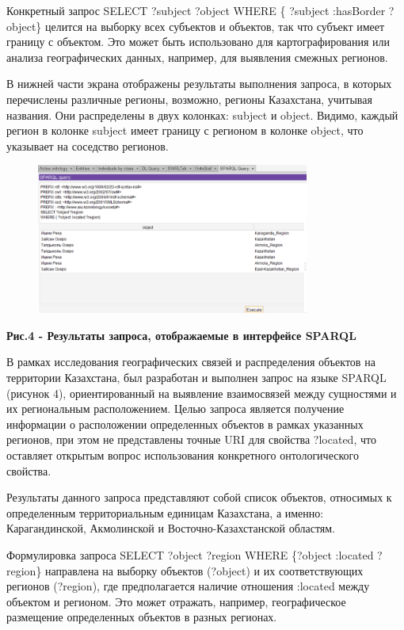 Конкретный запрос SELECT ?subject ?object WHERE \{ ?subject :hasBorder
?object\} целится на выборку всех субъектов и объектов, так что субъект
имеет границу с объектом. Это может быть использовано для
картографирования или анализа географических данных, например, для
выявления смежных регионов.

В нижней части экрана отображены результаты выполнения запроса, в
которых перечислены различные регионы, возможно, регионы Казахстана,
учитывая названия. Они распределены в двух колонках: subject и object.
Видимо, каждый регион в колонке subject имеет границу с регионом в
колонке object, что указывает на соседство регионов.

\begin{figure}[H]
	\centering
	\includegraphics[width=0.8\textwidth]{assets/41}
	\caption*{}
\end{figure}

\textbf{Рис.4 - Результаты запроса, отображаемые в интерфейсе SPARQL}

В рамках исследования географических связей и распределения объектов на
территории Казахстана, был разработан и выполнен запрос на языке SPARQL
(рисунок 4), ориентированный на выявление взаимосвязей между сущностями
и их региональным расположением. Целью запроса является получение
информации о расположении определенных объектов в рамках указанных
регионов, при этом не представлены точные URI для свойства ?located, что
оставляет открытым вопрос использования конкретного онтологического
свойства.

Результаты данного запроса представляют собой список объектов, относимых
к определенным территориальным единицам Казахстана, а именно:
Карагандинской, Акмолинской и Восточно-Казахстанской областям.

Формулировка запроса SELECT ?object ?region WHERE \{?object :located
?region\} направлена на выборку объектов (?object) и их соответствующих
регионов (?region), где предполагается наличие отношения :located между
объектом и регионом. Это может отражать, например, географическое
размещение определенных объектов в разных регионах.

